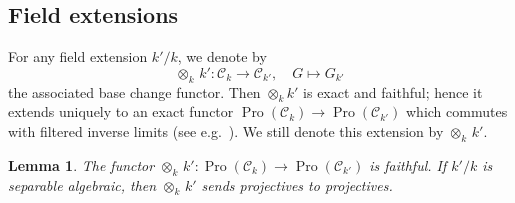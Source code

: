 \documentclass[11pt]{article}
\newtheorem{lemm}[theo]{Lemma}
\theoremstyle{definition}
\numberwithin{equation}{section}
\newcommand\cC{{\mathcal C}}
\DeclareMathOperator{\Pro}{Pro}
\theoremstyle{remark}
\begin{document}
\subsection{Field extensions}\label{subsec:field}


For any field extension $k'/k$, we denote by
\[
\otimes_k \, k' : \cC_k \longrightarrow \cC_{k'},
\quad G \longmapsto G_{k'}
\]
the associated base change functor. Then $\otimes_k k'$ is exact and faithful; hence it extends uniquely to an exact functor $\Pro(\cC_k) \to \Pro(\cC_{k'})$ which commutes with filtered inverse limits (see e.g.~\cite[Prop.~6.1.9, Cor.~8.6.8]{KS}). We still denote this extension by $\otimes_k \, k'$.

\begin{lemm}\label{lem:change}
The functor $\otimes_k \, k' : \Pro(\cC_k) \to \Pro(\cC_{k'})$ is faithful. If $k'/k$ is separable algebraic, then $\otimes_k \, k'$ sends projectives to projectives.
\end{lemm}
\end{document}
